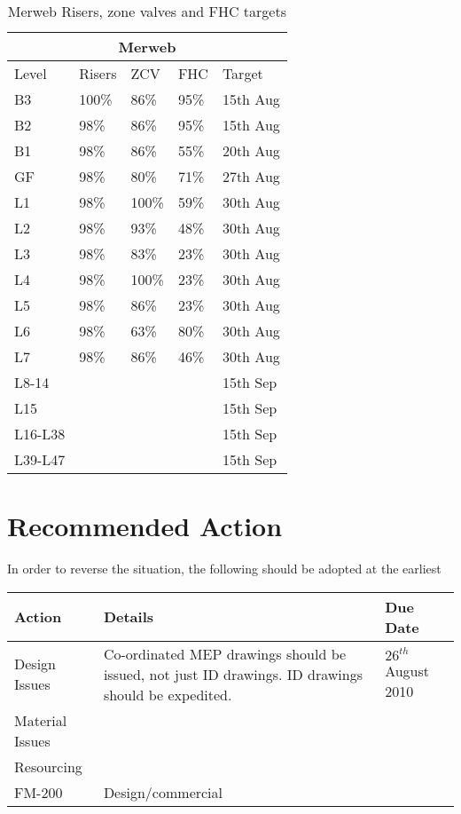 \begin{table}[htbp]\label{tbl:fire3}
\begin{center}
\begin{tabular}{lllll}
\toprule
\multicolumn{5}{c}{Merweb}\\
\midrule
Level	&Risers &ZCV	&FHC  &Target\\
\midrule
B3	&100\% &86\%	 &95\%  &15th Aug\\
B2	&98\%	  &86\%	&95\%   &15th Aug\\
\midrule
B1	&98\%	 &86\%	&55\%  &20th Aug\\
GF	&98\%	 &80\%	&71\%  &27th Aug\\
\midrule
L1	&98\%	 &100\%	&59\%  &30th Aug\\
L2	&98\%	 &93\%	&48\%  &30th Aug\\
L3	&98\%	 &83\%	&23\%  &30th Aug\\
L4	&98\%	 &100\%	&23\%  &30th Aug\\
L5	&98\%	 &86\%	&23\%  &30th Aug\\
L6	&98\%	 &63\%	&80\%  &30th Aug\\
L7	&98\%	&86\%	&46\%              &30th Aug\\
\midrule
L8-14	&         &          &      &15th Sep\\ 	 	 
L15	&        &           &      &15th Sep\\ 	 	 
L16-L38 &      &           &      &15th Sep\\	 	 	 
L39-L47 &      &           &      &15th Sep\\	 	 	 
\bottomrule
\end{tabular}
\caption{Merweb Risers, zone valves and FHC targets}
\end{center}
\end{table}


\section{Recommended Action}
In order to reverse the situation, the following should be adopted at the earliest 

	\begin{center} 
	    \begin{tabular}{lp{3cm}l}
	      \toprule
	      Action   &  Details& Due Date  \\
	      \midrule
	      Design Issues       & Co-ordinated MEP drawings should be issued, not just ID drawings. ID drawings should be expedited. 
  &  $26^{th}$ August 2010  \\
	      Material Issues &&\\
	      Resourcing && \\
	      FM-200 & Design/commercial&\\ 
	      \bottomrule
	    \end{tabular}
          \end{center}

